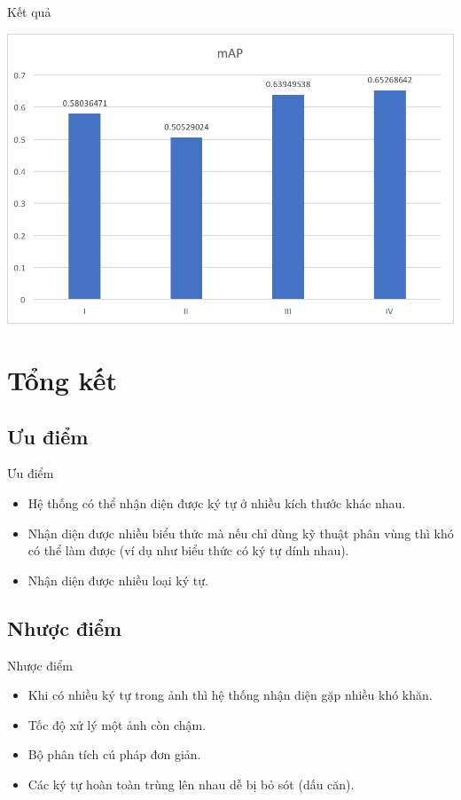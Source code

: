 \documentclass{beamer}
\begin{document}
	\begin{frame}{Kết quả}
		\begin{center}
			\centering
			\includegraphics[width=0.775\linewidth]{mAP.png}
			\vspace{0.5cm}
		\end{center}
	\end{frame}
	\section{Tổng kết}
	\subsection{Ưu điểm}
	\begin{frame}{Ưu điểm}
		\begin{itemize}
			\item Hệ thống có thể nhận diện được ký tự ở nhiều kích thước khác nhau.
			\item Nhận diện được nhiều biểu thức mà nếu chỉ dùng kỹ thuật phân vùng thì khó có thể làm được (ví dụ như biểu thức có ký tự dính nhau).
			\item Nhận diện được nhiều loại ký tự.
		\end{itemize}
	\end{frame}
	\subsection{Nhược điểm}
	\begin{frame}{Nhược điểm}
		\begin{itemize}
			\item Khi có nhiều ký tự trong ảnh thì hệ thống nhận diện gặp nhiều khó khăn.
			\item Tốc độ xử lý một ảnh còn chậm.
			\item Bộ phân tích cú pháp đơn giản.
			\item Các ký tự hoàn toàn trùng lên nhau dễ bị bỏ sót (dấu căn).
		\end{itemize}
	\end{frame}
	
\end{document}
